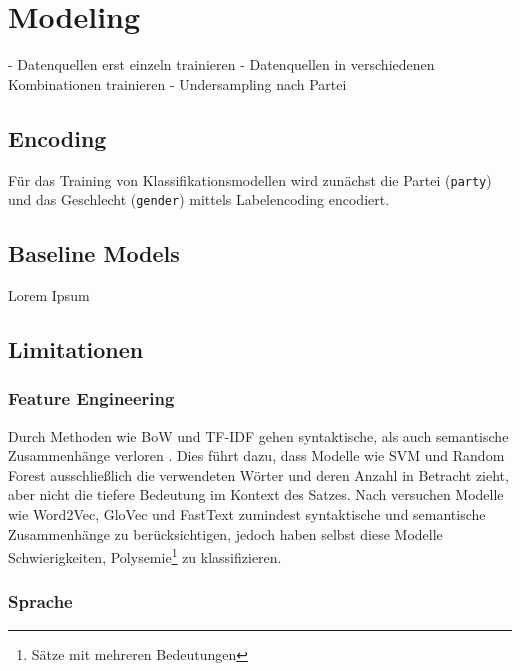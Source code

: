 \section{Modeling} \label{sec:modeling}

- Datenquellen erst einzeln trainieren
- Datenquellen in verschiedenen Kombinationen trainieren
- Undersampling nach Partei 

\subsection{Encoding}

Für das Training von Klassifikationsmodellen wird zunächst die Partei (\texttt{party}) und das Geschlecht (\texttt{gender}) mittels Labelencoding encodiert.

\subsection{Baseline Models}

Lorem Ipsum

\subsection{Limitationen}

\subsubsection{Feature Engineering}


Durch Methoden wie \ac{BoW} und \ac{TF-IDF} gehen syntaktische, als auch semantische Zusammenhänge verloren \autocite[48\psq]{kowsari_text_2019}. Dies führt dazu, dass Modelle wie \ac{SVM} und Random Forest ausschließlich die verwendeten Wörter und deren Anzahl in Betracht zieht, aber nicht die tiefere Bedeutung im Kontext des Satzes. Nach \textcite{kowsari_text_2019} versuchen Modelle wie Word2Vec, GloVec und FastText zumindest syntaktische und semantische Zusammenhänge zu berücksichtigen, jedoch haben selbst diese Modelle Schwierigkeiten, Polysemie\footnote{Sätze mit mehreren Bedeutungen} zu klassifizieren.

\subsubsection{Sprache}


